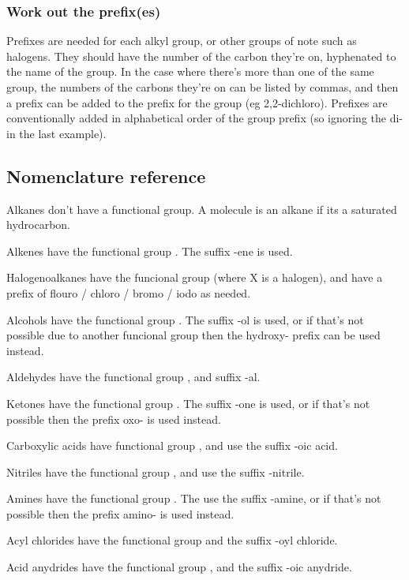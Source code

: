 \subsubsection{Work out the prefix(es)}
Prefixes are needed for each alkyl group, or other groups of note such as halogens. They should have the number of the carbon they're on, hyphenated to the name of the group. In the case where there's more than one of the same group, the numbers of the carbons they're on can be listed by commas, and then a prefix can be added to the prefix for the group (eg 2,2-dichloro). Prefixes are conventionally added in alphabetical order of the group prefix (so ignoring the di- in the last example).

\subsection{Nomenclature reference}
Alkanes don't have a functional group. A molecule is an alkane if its a saturated hydrocarbon.

Alkenes have the functional group . The suffix -ene is used.

Halogenoalkanes have the funcional group  (where X is a halogen), and have a prefix of flouro / chloro / bromo / iodo as needed.

Alcohols have the functional group . The suffix -ol is used, or if that's not possible due to another funcional group then the hydroxy- prefix can be used instead.

Aldehydes have the functional group , and suffix -al.

Ketones have the functional group . The suffix -one is used, or if that's not possible then the prefix oxo- is used instead.

Carboxylic acids have functional group , and use the suffix -oic acid.

Nitriles have the functional group , and use the suffix -nitrile.

Amines have the functional group . The use the suffix -amine, or if that's not possible then the prefix amino- is used instead.

Acyl chlorides have the functional group  and the suffix -oyl chloride.

Acid anydrides have the functional group , and the suffix -oic anydride.

